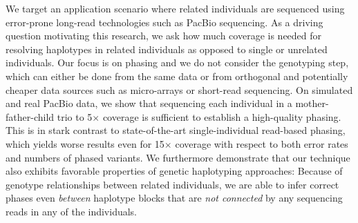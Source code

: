 We target an application scenario where related individuals are sequenced using error-prone long-read technologies such as PacBio sequencing.
As a driving question motivating this research, we ask how much coverage is needed for resolving haplotypes in related individuals as opposed to single or unrelated individuals.
Our focus is on phasing and we do not consider the genotyping step, which can either be done from the same data or from orthogonal and potentially cheaper data sources such as micro-arrays or short-read sequencing.
On simulated and real PacBio data, we show that sequencing each individual in a mother-father-child trio to 5$\times$ coverage is sufficient to establish a high-quality phasing.
This is in stark contrast to state-of-the-art single-individual read-based phasing, which yields worse results even for 15$\times$ coverage with respect to both error rates and numbers of phased variants.
We furthermore demonstrate that our technique also exhibits favorable properties of genetic haplotyping approaches:
Because of genotype relationships between related individuals, we are able to infer correct phases even \emph{between} haplotype blocks that are \emph{not connected} by any sequencing reads in any of the individuals.


